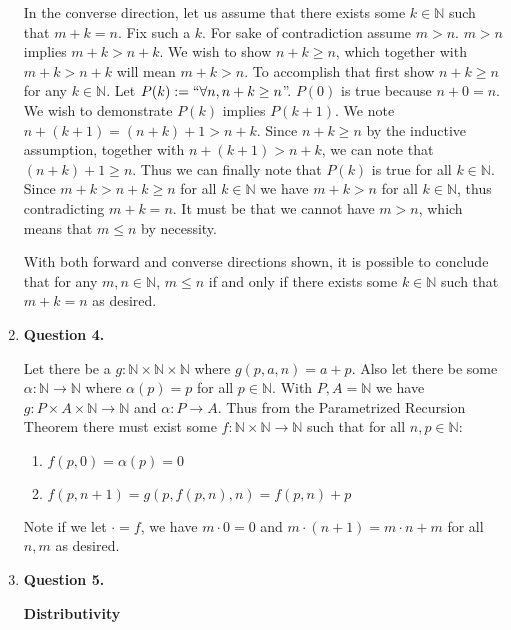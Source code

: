\documentclass{article}
\begin{document}
\begin{enumerate}
		\medskip
		In the converse direction, let us assume that there exists some $k \in \mathbb{N}$ such that $m + k = n$. Fix such a $k$. For sake of contradiction assume $m > n$. $m > n$ implies $m + k > n + k$. We wish to show $n + k \geq n$, which together with $m + k > n + k$ will mean $m + k > n$. To accomplish that first show $n + k \geq n$ for any $k \in \mathbb{N}$. Let $P(k) := ``\forall n, n + k \geq n$''. $P(0)$ is true because $n + 0 = n$. We wish to demonstrate $P(k)$ implies $P(k + 1)$.  We note $n + (k + 1) = (n + k) + 1 > n + k$. Since $n + k \geq n$ by the inductive assumption, together with $n + (k + 1) > n + k$, we can note that $(n + k) + 1 \geq n$. Thus we can finally note that $P(k)$ is true for all $k \in \mathbb{N}$. Since $m + k > n + k \geq n$ for all $k \in \mathbb{N}$ we have $m + k > n$ for all $k \in \mathbb{N}$, thus contradicting $m + k = n$. It must be that we cannot have $m > n$, which means that $m \leq n$ by necessity.
		
		\medskip
		With both forward and converse directions shown, it is possible to conclude that for any $m,n \in \mathbb{N}$, $m \leq n$ if and only if there exists some $k \in \mathbb{N}$ such that $m + k = n$ as desired.
		
		\item \textbf{Question 4.}
		
		Let there be a $g: \mathbb{N} \times \mathbb{N} \times \mathbb{N}$ where $g(p,a,n) = a + p$. Also let there be some $\alpha: \mathbb{N} \xrightarrow{} \mathbb{N}$ where $\alpha(p) = p$ for all $p \in \mathbb{N}$. With $P,A = \mathbb{N}$ we have $g: P \times A \times \mathbb{N} \xrightarrow{} \mathbb{N}$ and $\alpha: P \xrightarrow{} A$. Thus from the Parametrized Recursion Theorem there must exist some $f: \mathbb{N} \times \mathbb{N} \xrightarrow{} \mathbb{N}$ such that for all $n, p \in \mathbb{N}$:
		\begin{enumerate}
			\item $f(p, 0) = \alpha(p) = 0$
			\item $f(p, n + 1) = g(p, f(p, n), n) = f(p, n) + p$
		\end{enumerate}
		
		Note if we let $\cdot = f$, we have $m \cdot 0 = 0$ and $m \cdot (n + 1) = m \cdot n + m$ for all $n,m$ as desired.
		
		\newpage
		\item \textbf{Question 5.}
		\medskip
		
		\medskip
		\textbf{Distributivity}
		\medskip
		

\end{enumerate}
\end{document}
